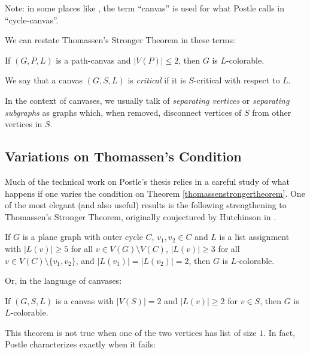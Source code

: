 Note: in some places like \cite{fivelistcoloring2}, the term ``canvas'' is used for what Postle calls in \cite{postlethesis} ``cycle-canvas''.

We can restate Thomassen's Stronger Theorem in these terms:

\begin{theorem}
If $(G, P, L)$ is a path-canvas and $|V(P)| \leq 2$, then $G$ is $L$-colorable.
\end{theorem}

\begin{definition}
We say that a canvas $(G, S, L)$ is \emph{critical} if it is $S$-critical with respect to $L$.
\end{definition}

In the context of canvases, we usually talk of \emph{separating vertices} or \emph{separating
subgraphs} as graphs which, when removed, disconnect vertices of $S$ from other vertices in $S$.



\subsection{Variations on Thomassen's Condition}

Much of the technical work on Postle's thesis relies in a careful study of what happens if one varies the condition on Theorem \ref{thomassenstrongertheorem}. One of the most elegant (and also useful) results is the following strengthening to Thomassen's Stronger Theorem, originally conjectured by Hutchinson in \cite{hutchinson2012outerplanar}.

\begin{theorem}
\label{twolistsofsizetwo}
If $G$ is a plane graph with outer cycle $C$, $v_1, v_2 \in C$ and $L$ is a list assignment with $|L(v)| \geq 5$ for all $v \in V(G) \setminus V(C)$, $|L(v)| \geq 3$ for all $v \in V(C) \setminus \{v_1, v_2\}$, and $|L(v_1)| = |L(v_2)| = 2$, then $G$ is $L$-colorable. 
\end{theorem}

Or, in the language of canvases:

\begin{theorem}
If $(G, S, L)$ is a canvas with $|V(S)| = 2$ and $|L(v)| \geq 2$ for $v \in S$, then $G$ is $L$-colorable.
\end{theorem}

This theorem is not true when one of the two vertices has list of size $1$. In fact, Postle characterizes exactly when it fails:

